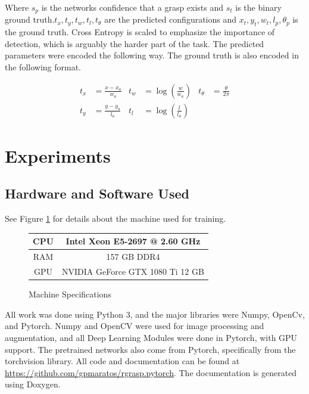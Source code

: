\documentclass{article}
\begin{document}
Where $s_p$ is the networks confidence that a grasp exists and $s_t$ is the binary ground
truth.$t_x, t_y, t_w, t_l, t_\theta$ are the predicted configurations and
$x_t, y_t, w_t, l_p, \theta_p$ is the ground truth. Cross Entropy is scaled to
emphasize the importance of detection, which is arguably the harder part of the task. The
predicted parameters were encoded the following way. The ground truth is also encoded in
the following format.

\begin{align*}
t_x&=\frac{x-x_a}{w_a} & t_w&=\log(\frac{w}{w_a}) & t_\theta&=\frac{\theta}{2\pi}\\
t_y&=\frac{y-y_a}{l_a} & t_l&=\log(\frac{l}{l_a}) & &
\end{align*}

\newpage
\section{Experiments}

\subsection{Hardware and Software Used}
See Figure \ref{fig:specs} for details about the machine used for training.

\begin{figure}
\centering
\begin{tabular}{|c|c|}
\hline
CPU&Intel Xeon E5-2697 @ 2.60 GHz\\
\hline
RAM&157 GB DDR4\\
\hline
GPU&NVIDIA GeForce GTX 1080 Ti 12 GB\\
\hline
\end{tabular}
\caption{Machine Specifications}
\label{fig:specs}
\end{figure}

All work was done using Python 3, and the major libraries were
Numpy, OpenCv, and Pytorch. Numpy and OpenCV were used for image
processing and augmentation, and all Deep Learning Modules were done
in Pytorch, with GPU support. The pretrained networks also come from
Pytorch, specifically from the torchvision library.
All code and documentation can be found
at \url{https://github.com/gpmaratos/rgrasp.pytorch}. The documentation
is generated using Doxygen.
\end{document}
